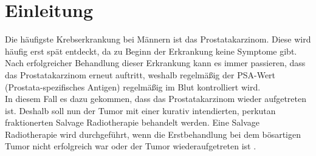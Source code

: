 \section{Einleitung}
\label{sec:Einleitung}
Die häufigste Krebserkrankung bei Männern ist das Prostatakarzinom.
Diese wird häufig erst spät entdeckt, da zu Beginn der Erkrankung keine Symptome gibt.
Nach erfolgreicher Behandlung dieser Erkrankung kann es immer passieren, dass das Prostatakarzinom
erneut auftritt, weshalb regelmäßig der PSA-Wert (Prostata-spezifisches Antigen) regelmäßig im Blut kontrolliert wird. \cite{Prostata} \\
In diesem Fall es dazu gekommen, dass das Prostatakarzinom wieder aufgetreten ist.
Deshalb soll nun der Tumor mit einer kurativ intendierten, perkutan fraktionerten Salvage Radiotherapie behandelt werden.
Eine Salvage Radiotherapie wird durchgeführt, wenn die Erstbehandlung bei dem bösartigen
Tumor nicht erfolgreich war oder der Tumor wiederaufgetreten ist \cite{Salvage}.
